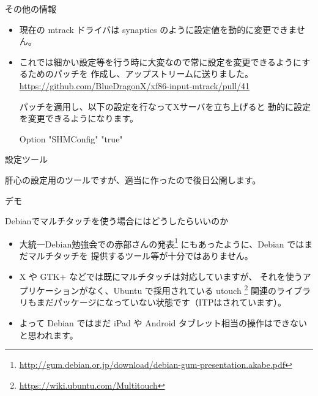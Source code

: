 \begin{frame}[containsverbatim]{その他の情報}

\begin{itemize}

\item 現在の mtrack ドライバは synaptics のように設定値を動的に変更できません。

\item これでは細かい設定等を行う時に大変なので常に設定を変更できるようにするためのパッチを
作成し、アップストリームに送りました。
\url{https://github.com/BlueDragonX/xf86-input-mtrack/pull/41}

パッチを適用し、以下の設定を行なってXサーバを立ち上げると
動的に設定を変更できるようになります。
\begin{commandline}
Option "SHMConfig" "true"
\end{commandline}

\end{itemize}

\end{frame}

\begin{frame}{設定ツール}

肝心の設定用のツールですが、適当に作ったので後日公開します。

\end{frame}

\begin{frame}{デモ}

\end{frame}

\begin{frame}{Debianでマルチタッチを使う場合にはどうしたらいいのか}

\begin{itemize}
\item 大統一Debian勉強会での赤部さんの発表\footnote{\url{http://gum.debian.or.jp/download/debian-gum-presentation.akabe.pdf}}
にもあったように、Debian ではまだマルチタッチを
提供するツール等が十分ではありません。

\item X や GTK+ などでは既にマルチタッチは対応していますが、
それを使うアプリケーションがなく、Ubuntu で採用されている utouch \footnote{\url{https://wiki.ubuntu.com/Multitouch}}
関連のライブラリもまだパッケージになっていない状態です（ITPはされています）。
\item よって Debian ではまだ iPad や Android タブレット相当の操作はできないと思われます。

\end{itemize}

\end{frame}

